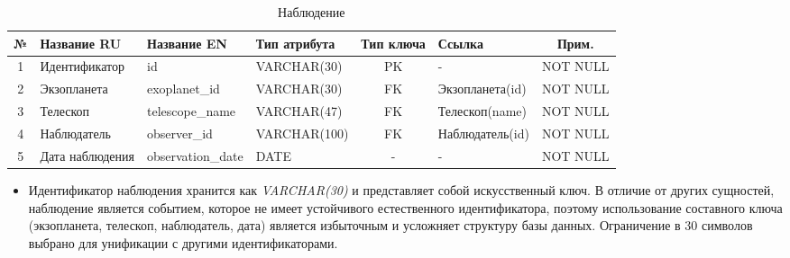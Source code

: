 \documentclass[14pt,a4paper]{extarticle}
\begin{document}
	\begin{table}[H]
		\centering
		\caption{Наблюдение}
		\small
\begin{tabular}{|c|p{3.2cm}|p{2.6cm}|p{2.8cm}|c|p{2.5cm}|c|}
\hline
№ & Название RU & Название EN & Тип атрибута & Тип ключа & Ссылка & Прим. \\
\hline
1 & Идентификатор & id & VARCHAR(30) & PK & - & NOT NULL \\
2 & Экзопланета & exoplanet_id & VARCHAR(30) & FK & Экзопланета(id) & NOT NULL \\
3 & Телескоп & telescope_name & VARCHAR(47) & FK & Телескоп(name) & NOT NULL \\
4 & Наблюдатель & observer_id & VARCHAR(100) & FK & Наблюдатель(id) & NOT NULL \\
5 & Дата наблюдения & observation_date & DATE & - & - & NOT NULL \\
\hline
\end{tabular}
	\end{table}

	\begin{itemize}
		\item Идентификатор наблюдения хранится как \textit{VARCHAR(30)} и представляет собой искусственный ключ. В отличие от других сущностей, наблюдение является событием, которое не имеет устойчивого естественного идентификатора, поэтому использование составного ключа (экзопланета, телескоп, наблюдатель, дата) является избыточным и усложняет структуру базы данных. Ограничение в 30 символов выбрано для унификации с другими идентификаторами.
	\end{itemize}

	\newpage
	
\end{document}
